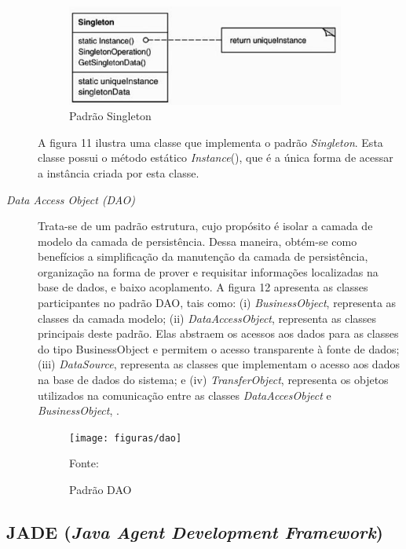 \begin{description}
\begin{figure}[h!]
\centering
\label{f08}
\includegraphics[width=0.9\textwidth]{figuras/singleton}
\caption{Padrão Singleton}
\end{figure}
\FloatBarrier

A figura 11 ilustra uma classe que implementa o padrão \textit{Singleton}. Esta classe possui o método estático \textit{Instance}(), que é a única forma de acessar a instância criada por esta classe.


\item[\textit{Data Access Object (DAO)}]

Trata-se de um padrão estrutura, cujo propósito é isolar a camada de modelo da camada de persistência. Dessa maneira, obtém-se como benefícios a simplificação da manutenção da camada de persistência,  organização na forma de prover e requisitar informações localizadas na base de dados, e baixo acoplamento. A figura 12 apresenta as classes participantes no padrão DAO, tais como: (i) \textit{BusinessObject}, representa as classes da camada modelo; (ii) \textit{DataAccessObject}, representa as classes principais deste padrão. Elas abstraem os acessos aos dados para as classes do tipo BusinessObject e permitem o acesso transparente à fonte de dados; (iii) \textit{DataSource}, representa as classes que implementam o acesso aos dados na base de dados do sistema; e (iv) \textit{TransferObject}, representa os objetos utilizados na comunicação entre as classes \textit{DataAccesObject} e \textit{BusinessObject}, \cite{oracle2015}.

\begin{figure}[h!]
\centering
\label{f09}
\texttt{[image: figuras/dao]}
\caption{Padrão DAO}{Fonte:\cite{oracle2015}}
\end{figure}
\FloatBarrier
\end{description}

\subsection{JADE (\textit{Java Agent Development Framework})}

